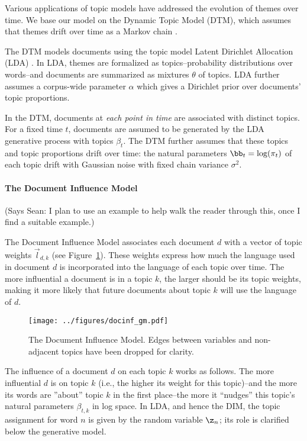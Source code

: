 Various applications of topic models have addressed the evolution of
themes over time.  We base our model on the Dynamic Topic
Model (DTM), which assumes that themes drift over time as a Markov
chain \cite{blei:2006}.

The DTM models documents using the topic model Latent Dirichlet
Allocation (LDA) \cite{blei:2003}. In LDA, themes are formalized as
topics--probability distributions over words--and documents are
summarized as mixtures $\theta$ of topics. LDA further assumes a
corpus-wide parameter $\alpha$ which gives a Dirichlet prior over
documents' topic proportions.

In the DTM, documents at \emph{each point in time} are associated with
distinct topics. For a fixed time $t$, documents are assumed to be
generated by the LDA generative process with topics $\beta_t$.  The
DTM further assumes that these topics and topic proportions drift over
time: the natural parameters $\bb_{t} = \log(\pi_{t})$ of each topic
drift with Gaussian noise with fixed chain variance $\sigma^2$.

\paragraph{The Document Influence Model}
(Says Sean: I plan to use an example to help walk the reader through this, once I find a suitable example.)

The Document Influence Model associates each document $d$ with a
vector of topic weights $\vec{l}_{d,k}$ (see
Figure~\ref{fig:doc_influence_model}).  These weights express how much
the language used in document $d$ is incorporated into the language of
each topic over time.  The more influential a document is in a topic
$k$, the larger should be its topic weights, making it more likely
that future documents about topic $k$ will use the language of $d$.

\begin{figure}
  \centering
  \vspace{0in}
  \texttt{[image: ../figures/docinf\_gm.pdf]}
  \caption{The Document Influence Model.  Edges between variables and
    non-adjacent topics have been dropped for clarity.}
 \label{fig:doc_influence_model}
  \vspace{-.1in}
\end{figure}

The influence of a document $d$ on each topic $k$ works as follows.
The more influential $d$ is on topic $k$ (i.e., the higher its weight
for this topic)--and the more its words are ''about'' topic $k$ in the
first place--the more it ``nudges'' this topic's natural parameters
$\beta_{t, k}$ in log space.  In LDA, and hence the DIM, the topic
assignment for word $n$ is given by the random variable $\z_n$; its
role is clarified below the generative model.

